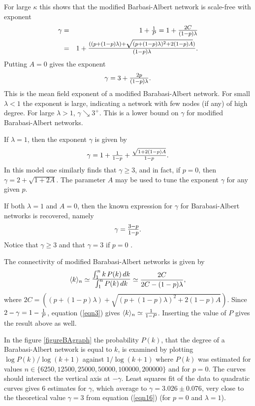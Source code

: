 \documentclass[12pt]{iopart}
\def\sfrac#1#2{\hbox{\normalsize $\frac{#1}{#2}$}}
\def\Sfrac#1#2{\hbox{\large$\frac{#1}{#2}$}}
\def\SSfrac#1#2{\hbox{\Large$\frac{#1}{#2}$}}
\def\Ref#1{(\ref{#1})}
\begin{document}
For large $\kappa$ this shows that the modified Barbasi-Albert network is scale-free with exponent
\begin{eqnarray}
\gamma &=& 1+ \sfrac{1}{P} = 1+ \Sfrac{2C}{(1-p)\lambda} \nonumber \\
&=& 1 + \Sfrac{((p+(1-p)\lambda)+\sqrt{(p+(1-p)\lambda)^2+2(1-p)A})}{(1-p)\lambda} .
\label{eqn15}   %
\end{eqnarray}
Putting $A=0$ gives the exponent
\begin{equation}
\gamma = 3 + \Sfrac{2p}{(1-p)\lambda} .
\label{eqn16}   %
\end{equation}
This is the mean field exponent of a modified Barabasi-Albert network.  For small $\lambda < 1$
the exponent is large, indicating a network  with few nodes (if any) of high degree.  
For large $\lambda>1$,  $\gamma \searrow 3^+$.  This is a lower bound 
on $\gamma$ for modified Barabasi-Albert networks.

If $\lambda = 1$, then the exponent $\gamma$ is given by
\begin{equation}
\gamma = 1 +\sfrac{1}{1-p} + \sfrac{\sqrt{1+2(1-p)A}}{1-p} .
\end{equation}
In this model one similarly finds that $\gamma \geq 3$, and in fact, if $p=0$, then
$\gamma = 2 +\sqrt{1+2A}$.  The parameter $A$ may be used to tune the
exponent $\gamma$ for any given $p$.

If both $\lambda=1$ and $A=0$, then the known expression for $\gamma$
for Barabasi-Albert networks is recovered, namely
\begin{equation}
\gamma = \Sfrac{3-p}{1-p}.
\end{equation}
Notice that $\gamma\geq 3$ and that $\gamma=3$ if $p=0$ \cite{BAJ99}.

The connectivity of modified Barabasi-Albert networks is given by
\begin{equation}
\langle k\rangle_n \simeq 
\SSfrac{\int_1^n k\, P(k) \, dk}{\int_1^n P(k) \, dk} 
\simeq \frac{2C}{2C-(1-p)\lambda} ,
\end{equation}
where $2C = ((p+(1-p)\lambda)+\sqrt{(p+(1-p)\lambda)^2+2(1-p)A})$.
Since $2-\gamma = 1-\sfrac{1}{P}$, equation \Ref{eqn3} gives
$\langle k\rangle_n \simeq \sfrac{1}{1-P}$.  Inserting the value of $P$ gives
the result above as well.

In the figure \ref{figureBAgraph} the probability $P(k)$, that the degree
of a Barabasi-Albert network is equal to $k$, is examined by plotting
$\log P(k) / \log (k+1)$ against $1/\log(k+1)$ where $P(k)$ was estimated for
values $n\in\{6250,12500,25000,50000,100000,200000\}$ and for $p=0$.
The curves should intersect the vertical axis at $-\gamma$.   Least squares
fit of the data to quadratic curves gives $6$ estimates for $\gamma$, which
average to $\gamma = 3.026 \pm 0.076$, very close to the theoretical value $\gamma=3$
from equation \Ref{eqn16} (for $p=0$ and $\lambda=1$). 
\end{document}

